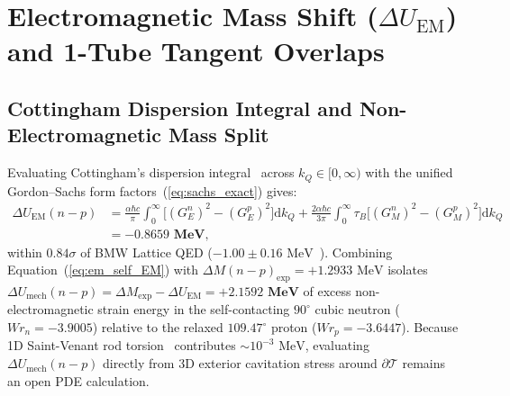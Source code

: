 \documentclass[11pt, a4paper]{article}
\DeclareRobustCommand{\dd}{\mathrm{d}}
\begin{document}
\section{\texorpdfstring{Electromagnetic Mass Shift ($\Delta U_{\mathrm{EM}}$) and 1-Tube Tangent Overlaps}{Electromagnetic Mass Shift and 1-Tube Tangent Overlaps}}
\label{sec:weak_mass_split}

\subsection{Cottingham Dispersion Integral and Non-Electromagnetic Mass Split}
Evaluating Cottingham's dispersion integral~\cite{cottingham1963} across $k_Q \in [0, \infty)$ with the unified Gordon--Sachs form factors~(\ref{eq:sachs_exact}) gives:
\begin{align}
    \Delta U_{\mathrm{EM}}(n - p) &= \frac{\alpha\hbar c}{\pi}\int_0^\infty \Big[(G_E^n)^2 - (G_E^p)^2\Big]\dd k_Q + \frac{2\alpha\hbar c}{3\pi}\int_0^\infty \tau_B\Big[(G_M^n)^2 - (G_M^p)^2\Big]\dd k_Q \nonumber\\
    &= \mathbf{-0.8659\text{ MeV}},
    \label{eq:em_self_EM}
\end{align}
within $0.84\sigma$ of BMW Lattice QED ($-1.00 \pm 0.16\text{ MeV}$~\cite{borsanyi2015}). Combining Equation~(\ref{eq:em_self_EM}) with $\Delta M(n - p)_{\mathrm{exp}} = +1.2933\text{ MeV}$ isolates $\Delta U_{\mathrm{mech}}(n - p) = \Delta M_{\mathrm{exp}} - \Delta U_{\mathrm{EM}} = \mathbf{+2.1592\text{ MeV}}$ of excess non-electromagnetic strain energy in the self-contacting $90^\circ$ cubic neutron ($Wr_n = -3.9005$) relative to the relaxed $109.47^\circ$ proton ($Wr_p = -3.6447$). Because 1D Saint-Venant rod torsion~\cite{saintvenant1855} contributes $\sim 10^{-3}\text{ MeV}$, evaluating $\Delta U_{\mathrm{mech}}(n - p)$ directly from 3D exterior cavitation stress around $\partial\mathcal{T}$ remains an open PDE calculation.
\end{document}
